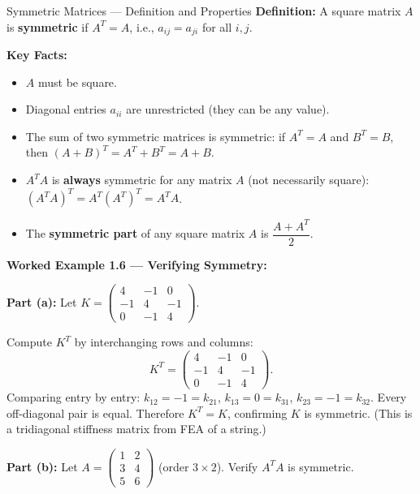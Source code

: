 \documentclass[12pt,a4paper]{article}
\begin{document}
\begin{infobox}{Symmetric Matrices --- Definition and Properties}
\textbf{Definition:} A square matrix $A$ is \textbf{symmetric} if $A^T = A$, i.e., $a_{ij} = a_{ji}$ for all $i, j$.

\textbf{Key Facts:}
\begin{itemize}
  \item $A$ must be square.
  \item Diagonal entries $a_{ii}$ are unrestricted (they can be any value).
  \item The sum of two symmetric matrices is symmetric: if $A^T = A$ and $B^T = B$, then $(A + B)^T = A^T + B^T = A + B$.
  \item $A^T A$ is \textbf{always} symmetric for any matrix $A$ (not necessarily square): $(A^T A)^T = A^T (A^T)^T = A^T A$.
  \item The \textbf{symmetric part} of any square matrix $A$ is $\dfrac{A + A^T}{2}$.
\end{itemize}
\end{infobox}

\textbf{Worked Example 1.6 --- Verifying Symmetry:}

\textbf{Part (a):} Let $K = \begin{pmatrix} 4 & -1 & 0 \\ -1 & 4 & -1 \\ 0 & -1 & 4 \end{pmatrix}$.

Compute $K^T$ by interchanging rows and columns:
\[
K^T = \begin{pmatrix} 4 & -1 & 0 \\ -1 & 4 & -1 \\ 0 & -1 & 4 \end{pmatrix}.
\]
Comparing entry by entry: $k_{12} = -1 = k_{21}$, $k_{13} = 0 = k_{31}$, $k_{23} = -1 = k_{32}$. Every off-diagonal pair is equal. Therefore $K^T = K$, confirming $K$ is symmetric. (This is a tridiagonal stiffness matrix from FEA of a string.)

\textbf{Part (b):} Let $A = \begin{pmatrix} 1 & 2 \\ 3 & 4 \\ 5 & 6 \end{pmatrix}$ (order $3 \times 2$). Verify $A^T A$ is symmetric.
\end{document}
